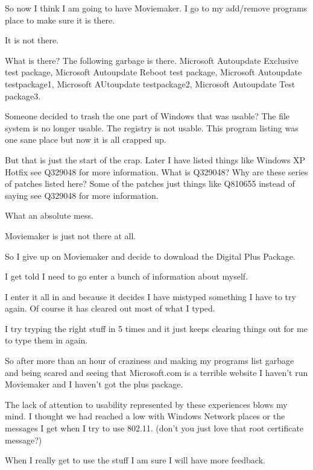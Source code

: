 So now I think I am going to have Moviemaker.
I go to my add/remove programs place to make sure it is there.

It is not there.

What is there? The following garbage is there.
Microsoft Autoupdate Exclusive test package, Microsoft Autoupdate Reboot test package,
Microsoft Autoupdate testpackage1, Microsoft AUtoupdate testpackage2,
Microsoft Autoupdate Test package3.

Someone decided to trash the one part of Windows that was usable?
The file system is no longer usable. The registry is not usable.
This program listing was one sane place but now it is all crapped up.

But that is just the start of the crap.
Later I have listed things like Windows XP Hotfix see Q329048 for more information.
What is Q329048? Why are these series of patches listed here?
Some of the patches just things like Q810655 instead of saying see Q329048
for more information.

What an absolute mess.

Moviemaker is just not there at all.

So I give up on Moviemaker and decide to download the Digital Plus Package.

I get told I need to go enter a bunch of information about myself.

I enter it all in and because it decides I have mistyped something I have to try again.
Of course it has cleared out most of what I typed.

I try tryping the right stuff in 5 times and it just keeps clearing things out
for me to type them in again.

So after more than an hour of craziness and making my programs list garbage
and being scared and seeing that Microsoft.com is a terrible website I haven't
run Moviemaker and I haven't got the plus package.

The lack of attention to usability represented by these experiences blows my mind.
I thought we had reached a low with Windows Network places or the messages I
get when I try to use 802.11. (don't you just love that root certificate message?)

When I really get to use the stuff I am sure I will have more feedback.

\bye
